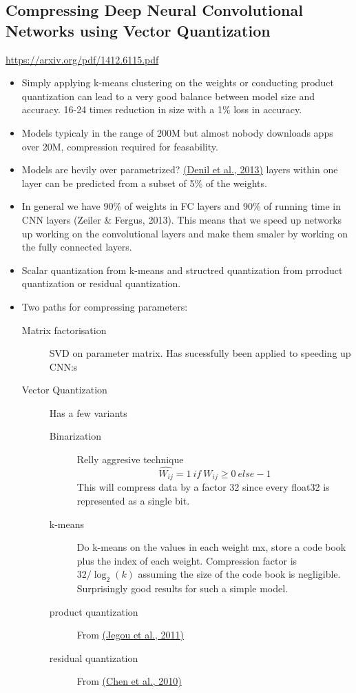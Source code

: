 \documentclass[11pt]{article}
\begin{document}
\subsection{Compressing Deep Neural Convolutional Networks using Vector Quantization}
\label{sec:orgf100e6f}
\url{https://arxiv.org/pdf/1412.6115.pdf}

\begin{itemize}
\item Simply applying k-means clustering on the weights or conducting product quantization can lead to a very good balance between model size and accuracy. 16-24 times reduction in size with a 1\% loss in accuracy.
\item Models typicaly in the range of 200M but almost nobody downloads apps over 20M, compression required for feasability.
\item Models are hevily over parametrized? \href{http://papers.nips.cc/paper/5025-predicting-parameters-in-deep-learning.pdf}{(Denil et al., 2013)} layers within one layer can be predicted from a subset of 5\% of the weights.
\item In general we have 90\% of weights in FC layers and 90\% of running time in CNN layers (Zeiler \& Fergus, 2013). This means that we speed up networks up working on the convolutional layers and make them smaler by working on the fully connected layers.
\item Scalar quantization from k-means and structred quantization from prroduct quantization or residual quantization.
\item Two paths for compressing parameters:
\begin{description}
\item[{Matrix factorisation}] SVD on parameter matrix. Has sucessfully been applied to speeding up CNN:s
\item[{Vector Quantization}] Has a few variants
\begin{description}
\item[{Binarization}] Relly aggresive technique \[ \hat{W_{ij}} = 1 ~ \textit{if} ~ W_{ij} \geq 0 ~ \textit{else} -1 \] This will compress data by a factor 32 since every float32 is represented as a single bit.
\item[{k-means}] Do k-means on the values in each weight mx, store a code book plus the index of each weight. Compression factor is \(32 / \log_2(k)\) assuming the size of the code book is negligible. Surprisingly good results for such a simple model.
\item[{product quantization}] From \href{https://lear.inrialpes.fr/pubs/2011/JDS11/jegou\_searching\_with\_quantization.pdf}{(Jegou et al., 2011)}
\item[{residual quantization}] From \href{http://www.mdpi.com/1424-8220/10/12/11259/htm}{(Chen et al., 2010)}
\end{description}
\end{description}
\end{itemize}
\end{document}
